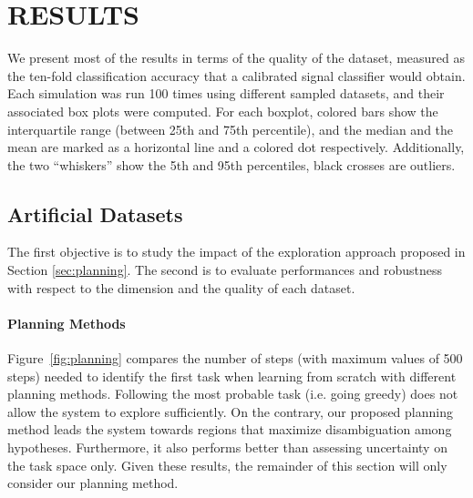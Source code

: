 \section{RESULTS}

We present most of the results in terms of the quality of the dataset, measured as the ten-fold classification accuracy that a calibrated signal classifier would obtain. Each simulation was run 100 times using different sampled datasets, and their associated box plots were computed. For each boxplot, colored bars show the interquartile range (between 25th and 75th percentile), and the median and the mean are marked as a horizontal line and a colored dot respectively. Additionally, the two ``whiskers'' show the 5th and 95th percentiles, black crosses are outliers. 

\subsection{Artificial Datasets}
The first objective is to study the impact of the exploration approach proposed in Section \ref{sec:planning}. The second is to evaluate performances and robustness with respect to the dimension and the quality of each dataset.

\paragraph{Planning Methods}
Figure~\ref{fig:planning} compares the number of steps (with maximum values of 500 steps) needed to identify the first task when learning from scratch with different planning methods. Following the most probable task (i.e. going greedy) does not allow the system to explore sufficiently. On the contrary, our proposed planning method leads the system towards regions that maximize disambiguation among hypotheses. Furthermore, it also performs better than assessing uncertainty on the task space only. Given these results, the remainder of this section will only consider our planning method.

